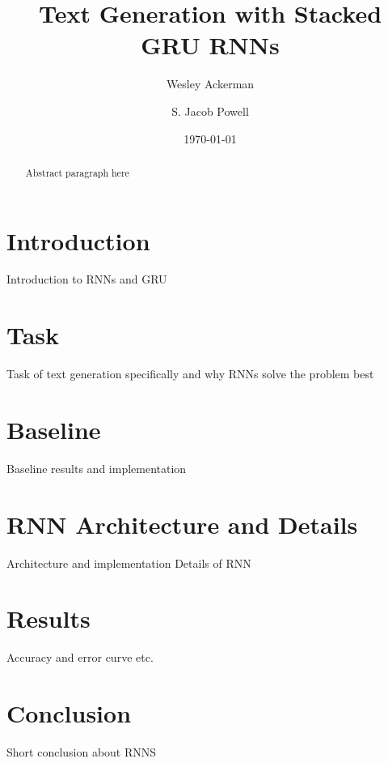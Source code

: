 \documentclass[12pt]{article}
\title{Text Generation with Stacked GRU RNNs}
\author{Wesley Ackerman \and S. Jacob Powell}
\date{\today}
\begin{document}
\maketitle

\begin{abstract}
    Abstract paragraph here
\end{abstract}

\section{Introduction}
Introduction to RNNs and GRU

\section{Task}
Task of text generation specifically and why RNNs solve the problem best

\section{Baseline}
Baseline results and implementation

\section{RNN Architecture and Details}
Architecture and implementation Details of RNN

\section{Results}
Accuracy and error curve etc.

\section{Conclusion}
Short conclusion about RNNS
\end{document}
